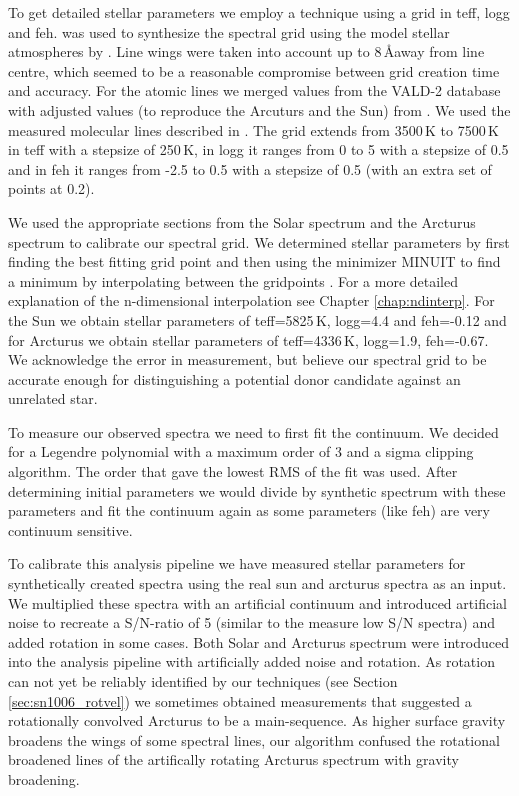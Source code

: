 To get detailed stellar parameters we employ a technique using a grid in \gls{teff}, \gls{logg} and \gls{feh}. 
\moog \citep{1973ApJ...184..839S} was used to synthesize the spectral grid using the model stellar atmospheres by \citet{2003IAUS..210P.A20C}. Line wings were taken into account up to 8\,\AA away from line centre, which seemed to be a reasonable compromise between grid creation time and accuracy. For the atomic lines we merged values from the VALD-2 database \citep{2000BaltA...9..590K} with adjusted values (to reproduce the Arcuturs and the Sun) from \cite{2008A&A...486..951G}. We used the measured
molecular lines described in  \citet{1995KurCD..23.....K}. 
The grid extends from 3500\,K to 7500\,K in \gls{teff} with a stepsize of 250\,K, in \gls{logg} it ranges from  0 to 5 with a stepsize of 0.5 and in \gls{feh} it ranges from -2.5 to 0.5 with a stepsize of 0.5 (with an extra set of points at 0.2). 

We used the appropriate sections from the Solar spectrum \citep{1984sfat.book.....K} and the Arcturus spectrum  \cite{2000vnia.book.....H} to calibrate our spectral grid. We determined stellar parameters by first finding the best fitting grid point and then using the minimizer MINUIT to find a minimum by interpolating between the gridpoints \citep[using][]{Barber96thequickhull}. For a more detailed explanation of the n-dimensional interpolation see Chapter \ref{chap:ndinterp}. For the Sun we obtain stellar parameters of \gls{teff}=5825\,K, \gls{logg}=4.4 and \gls{feh}=-0.12 and for Arcturus we obtain stellar parameters of \gls{teff}=4336\,K, \gls{logg}=1.9, \gls{feh}=-0.67. We acknowledge the error in measurement, but believe our spectral grid to be accurate enough for distinguishing a potential donor candidate against an unrelated star. 


To measure our observed spectra we need to first fit the continuum. We decided for a Legendre polynomial with a maximum order of 3 and a sigma clipping algorithm. The order that gave the lowest RMS of the fit was used. After determining initial parameters we would divide by synthetic spectrum with these parameters and fit the continuum again as some parameters (like \gls{feh}) are very continuum sensitive.  

To calibrate this analysis pipeline we have measured stellar parameters for synthetically created spectra using the real sun and arcturus spectra as an input. We multiplied these spectra with an artificial continuum and introduced artificial noise to recreate a S/N-ratio of 5 (similar to the measure low S/N spectra) and added rotation in some cases. Both Solar and Arcturus spectrum were introduced into the analysis pipeline with artificially added noise and rotation. As rotation can not yet be reliably identified by our techniques (see Section \ref{sec:sn1006_rotvel}) we sometimes obtained measurements that suggested a rotationally convolved Arcturus to be a main-sequence. As higher surface gravity broadens the wings of some spectral lines, our algorithm confused the rotational broadened lines of the artifically rotating Arcturus spectrum with gravity broadening. 

